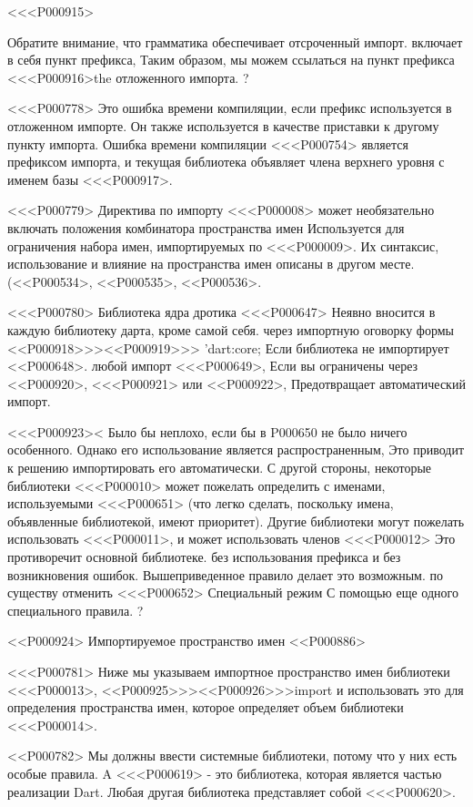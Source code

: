 <<<P000915>{%
Обратите внимание, что грамматика обеспечивает отсроченный импорт.
включает в себя пункт префикса,
Таким образом, мы можем ссылаться на пункт префикса <<<P000916>{the} отложенного импорта.%
?

<<<P000778>%
Это ошибка времени компиляции, если префикс используется в отложенном импорте.
Он также используется в качестве приставки к другому пункту импорта.
Ошибка времени компиляции <<<P000754> является префиксом импорта,
и текущая библиотека объявляет члена верхнего уровня с именем базы <<<P000917>.

<<<P000779>%
Директива по импорту <<<P000008> может необязательно включать положения комбинатора пространства имен
Используется для ограничения набора имен, импортируемых по <<<P000009>.
Их синтаксис, использование и влияние на пространства имен описаны в другом месте.
(<<P000534>, <<P000535>,
<<P000536>.

<<<P000780>%
Библиотека ядра дротика <<<P000647>
Неявно вносится в каждую библиотеку дарта, кроме самой себя.
через импортную оговорку формы
<<P000918>>>{<<P000919>>>{} 'dart:core;}
Если библиотека не импортирует <<P000648>.
любой импорт <<<P000649>,
Если вы ограничены через <<P000920>, <<<P000921> или <<P000922>,
Предотвращает автоматический импорт.

<<<P000923><%
Было бы неплохо, если бы в P000650 не было ничего особенного.
Однако его использование является распространенным,
Это приводит к решению импортировать его автоматически.
С другой стороны, некоторые библиотеки <<<P000010> может пожелать определить
с именами, используемыми <<<P000651>
(что легко сделать, поскольку имена, объявленные библиотекой, имеют приоритет).
Другие библиотеки могут пожелать использовать <<<P000011>,
и может использовать членов <<<P000012> Это противоречит основной библиотеке.
без использования префикса и без возникновения ошибок.
Вышеприведенное правило делает это возможным.
по существу отменить <<<P000652> Специальный режим
С помощью еще одного специального правила.%
?

<<P000924> Импортируемое пространство имен
<<P000886>

<<<P000781>%
Ниже мы указываем импортное пространство имен библиотеки <<<P000013>,
<<P000925>>>{<<P000926>>>{import}}
и использовать это для определения пространства имен, которое определяет объем библиотеки <<<P000014>.

<<P000782>%
Мы должны ввести системные библиотеки, потому что у них есть особые правила.
A <<<P000619> - это библиотека, которая является частью реализации Dart.
Любая другая библиотека представляет собой <<<P000620>.

}
